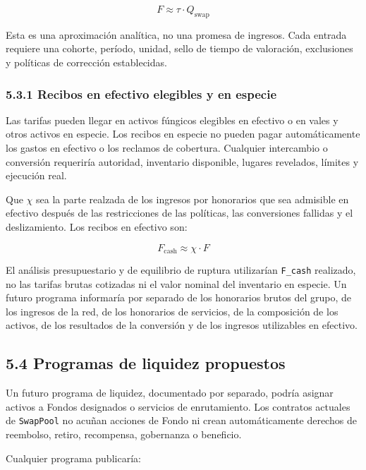 \documentclass[11pt]{article}
\begin{document}
\[
F \approx \tau \cdot Q_{\mathrm{swap}}
\]

Esta es una aproximación analítica, no una promesa de ingresos. Cada entrada requiere una cohorte, período, unidad, sello de tiempo de valoración, exclusiones y políticas de corrección establecidas.

\subsubsection*{5.3.1 Recibos en efectivo elegibles y en especie}

Las tarifas pueden llegar en activos fúngicos elegibles en efectivo o en vales y otros activos en especie. Los recibos en especie no pueden pagar automáticamente los gastos en efectivo o los reclamos de cobertura. Cualquier intercambio o conversión requeriría autoridad, inventario disponible, lugares revelados, límites y ejecución real.

Que \texttt{$\chi$} sea la parte realzada de los ingresos por honorarios que sea admisible en efectivo después de las restricciones de las políticas, las conversiones fallidas y el deslizamiento. Los recibos en efectivo son:

\[
F_{\mathrm{cash}} \approx \chi \cdot F
\]

El análisis presupuestario y de equilibrio de ruptura utilizarían \texttt{F\_cash} realizado, no las tarifas brutas cotizadas ni el valor nominal del inventario en especie. Un futuro programa informaría por separado de los honorarios brutos del grupo, de los ingresos de la red, de los honorarios de servicios, de la composición de los activos, de los resultados de la conversión y de los ingresos utilizables en efectivo.

\subsection*{5.4 Programas de liquidez propuestos}

Un futuro programa de liquidez, documentado por separado, podría asignar activos a Fondos designados o servicios de enrutamiento. Los contratos actuales de \texttt{SwapPool} no acuñan acciones de Fondo ni crean automáticamente derechos de reembolso, retiro, recompensa, gobernanza o beneficio.

Cualquier programa publicaría:
\end{document}
